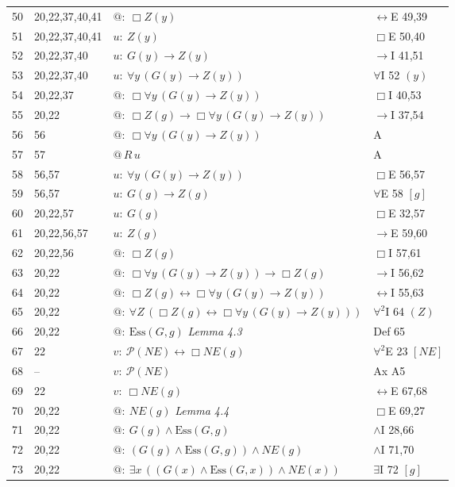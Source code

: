 {\begin{longtable}{@{}r>{\raggedright}p{}p{}>{\raggedright\arraybackslash}p{}@{}}
50 & 20,22,37,40,41 & $@:\ \Box Z(y)$ & $\leftrightarrow$E 49,39\\
51 & 20,22,37,40,41 & $u:\ Z(y)$ & $\Box$E 50,40\\
52 & 20,22,37,40 & $u:\ G(y) \to Z(y)$ & $\to$I 41,51\\
53 & 20,22,37,40 & $u:\ \forall y\, (G(y) \to Z(y))$ & $\forall$I 52 $(y)$\\
54 & 20,22,37 & $@:\ \Box \forall y\, (G(y) \to Z(y))$ & $\Box$I 40,53\\
55 & 20,22 & $@:\ \Box Z(g) \to \Box \forall y\, (G(y) \to Z(y))$ & $\to$I 37,54\\
56 & 56 & $@:\ \Box \forall y\, (G(y) \to Z(y))$ & A\\
57 & 57 & $@\,R\,u$ & A\\
58 & 56,57 & $u:\ \forall y\, (G(y) \to Z(y))$ & $\Box$E 56,57\\
59 & 56,57 & $u:\ G(g) \to Z(g)$ & $\forall$E 58 $[g]$\\
60 & 20,22,57 & $u:\ G(g)$ & $\Box$E 32,57\\
61 & 20,22,56,57 & $u:\ Z(g)$ & $\to$E 59,60\\
62 & 20,22,56 & $@:\ \Box Z(g)$ & $\Box$I 57,61\\
63 & 20,22 & $@:\ \Box \forall y\, (G(y) \to Z(y)) \to \Box Z(g)$ & $\to$I 56,62\\
64 & 20,22 & $@:\ \Box Z(g) \leftrightarrow \Box \forall y\, (G(y) \to Z(y))$ & $\leftrightarrow$I 55,63\\
65 & 20,22 & $@:\ \forall Z\, (\Box Z(g) \leftrightarrow \Box \forall y\, (G(y) \to Z(y)))$ & $\forall^2$I 64 $(Z)$\\
66 & 20,22 & $@:\ \mathrm{Ess}(G,g)$ \hfill{\itshape Lemma 4.3} & Def 65\\
67 & 22 & $v:\ \mathcal{P}(\mathit{NE}) \leftrightarrow \Box \mathit{NE}(g)$ & $\forall^2$E 23 $[\mathit{NE}]$\\
68 & -- & $v:\ \mathcal{P}(\mathit{NE})$ & Ax A5\\
69 & 22 & $v:\ \Box \mathit{NE}(g)$ & $\leftrightarrow$E 67,68\\
70 & 20,22 & $@:\ \mathit{NE}(g)$ \hfill{\itshape Lemma 4.4} & $\Box$E 69,27\\
71 & 20,22 & $@:\ G(g) \wedge \mathrm{Ess}(G,g)$ & $\wedge$I 28,66\\
72 & 20,22 & $@:\ (G(g) \wedge \mathrm{Ess}(G,g)) \wedge \mathit{NE}(g)$ & $\wedge$I 71,70\\
73 & 20,22 & $@:\ \exists x\, ((G(x) \wedge \mathrm{Ess}(G,x)) \wedge \mathit{NE}(x))$ & $\exists$I 72 $[g]$\\

\end{longtable}}
